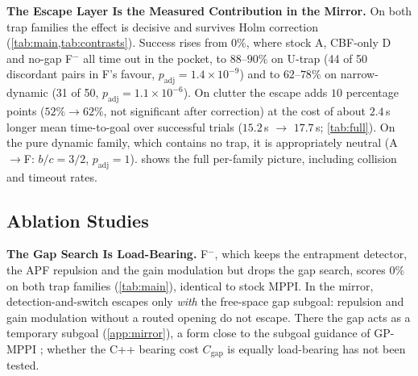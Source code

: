 


\noindent\textbf{The Escape Layer Is the Measured Contribution in the Mirror.} On both trap families the effect is decisive and survives Holm correction (\cref{tab:main,tab:contrasts}). Success rises from $0\%$, where stock A, CBF-only D and no-gap F$^{-}$ all time out in the pocket, to $88$--$90\%$ on U-trap (44 of 50 discordant pairs in F's favour, $p_{\mathrm{adj}}=1.4\times10^{-9}$) and to $62$--$78\%$ on narrow-dynamic (31 of 50, $p_{\mathrm{adj}}=1.1\times10^{-6}$). On clutter the escape adds $10$ percentage points ($52\%\to62\%$, not significant after correction) at the cost of about $2.4$\,s longer mean time-to-goal over successful trials ($15.2$\,s $\to$ $17.7$\,s; \cref{tab:full}). On the pure dynamic family, which contains no trap, it is appropriately neutral (A$\to$F: $b/c=3/2$, $p_{\mathrm{adj}}=1$).  shows the full per-family picture, including collision and timeout rates.



\subsection{Ablation Studies}\label{sec:ablation}

\noindent\textbf{The Gap Search Is Load-Bearing.} F$^{-}$, which keeps the entrapment detector, the APF repulsion and the gain modulation but drops the gap search, scores $0\%$ on both trap families (\cref{tab:main}), identical to stock MPPI. In the mirror, detection-and-switch escapes only \emph{with} the free-space gap subgoal: repulsion and gain modulation without a routed opening do not escape. There the gap acts as a temporary subgoal (\cref{app:mirror}), a form close to the subgoal guidance of GP-MPPI \citep{gp_mppi}; whether the C++ bearing cost $C_{\mathrm{gap}}$ is equally load-bearing has not been tested.

